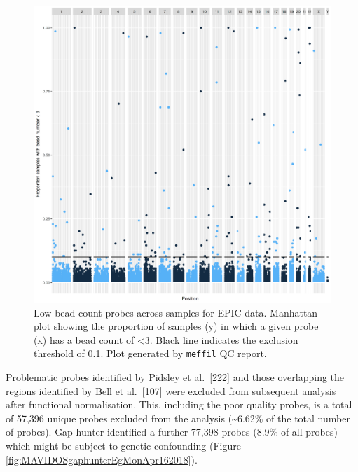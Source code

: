 \documentclass[
]{book}
\begin{document}
\begin{figure}

{\centering \includegraphics[width=0.8\linewidth]{figs/MAVIDOSqcEPICbeadNumAcross} 

}

\caption{Low bead count probes across samples for EPIC data. Manhattan plot showing the proportion of samples (y) in which a given probe (x) has a bead count of \textless3. Black line indicates the exclusion threshold of 0.1. Plot generated by \texttt{meffil} QC report.}\label{fig:MAVIDOSqcEPICbeadNumAcross}
\end{figure}



Problematic probes identified by Pidsley et al.~{[}\protect\hyperlink{ref-Pidsley2016}{222}{]} and those overlapping the regions identified by Bell et al.~{[}\protect\hyperlink{ref-Bell2017a}{107}{]} were excluded from subsequent analysis after functional normalisation.
This, including the poor quality probes, is a total of 57,396 unique probes excluded from the analysis (\textasciitilde6.62\% of the total number of probes).
Gap hunter identified a further 77,398 probes (8.9\% of all probes) which might be subject to genetic confounding (Figure \ref{fig:MAVIDOSgaphunterEgMonApr162018}).
\end{document}
